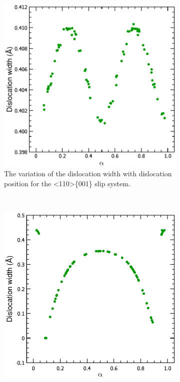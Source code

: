 \begin{figure}
\centering
\begin{subfigure}{0.4\textwidth}
\centering
\includegraphics[width=\textwidth]{NaCl_110_001_w_vs_a}
\caption{The variation of the dislocation width with dislocation position for the <110>\{001\} slip system. \label{fig:NaCl_110_001_w_variation}}
\end{subfigure}
~
\begin{subfigure}{0.4\textwidth}
\centering
\includegraphics[width=\textwidth]{NaCl_110_110_w_vs_a}

\end{subfigure}
\end{figure}
